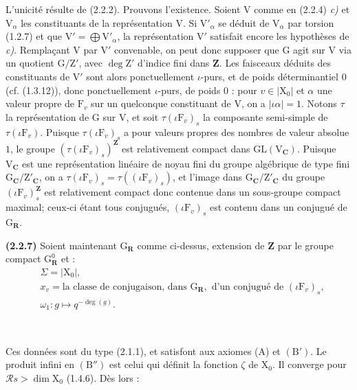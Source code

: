 \documentclass[11pt,leqno]{article}
\newcommand{\Page}[1]{\ifvmode\noindent\else\unskip\ \fi{\footnotesize\textcolor{gray}{[p.\,#1]}}\ \ignorespaces}
\begin{document}
L’unicité résulte de (2.2.2). Prouvons l’existence. Soient \(\mathrm V\) comme en (2.2.4) \textit{c)} et \(\mathrm V_\alpha\) les constituants de la représentation \(\mathrm V\). Si \(\mathrm V'_\alpha\) se déduit de \(\mathrm V_\alpha\) par torsion (1.2.7) et que \(\mathrm V'=\bigoplus\mathrm V'_\alpha\), la représentation \(\mathrm V'\) satisfait encore les hypothèses de \textit{c)}. Remplaçant \(\mathrm V\) par \(\mathrm V'\) convenable, on peut donc supposer que \(\mathrm G\) agit sur \(\mathrm V\) via un quotient \(\mathrm G/\mathrm Z'\), avec \(\deg\mathrm Z'\) d’indice fini dans \(\mathbf Z\). Les faisceaux déduits des constituants de \(\mathrm V'\) sont alors ponctuellement \(\iota\)-purs, et de poids déterminantiel \(0\) (cf. (1.3.12)), donc ponctuellement \(\iota\)-purs, de poids \(0\) : pour \(v\in|\mathrm X_0|\) et \(\alpha\) une valeur propre de \(\mathrm F_v\) sur un quelconque constituant de \(\mathrm V\), on a \(|\iota\alpha|=1\). Notons \(\tau\) la représentation de \(\mathrm G\) sur \(\mathrm V\), et soit \(\tau(\iota\mathrm F_v)_s\) la composante semi-simple de \(\tau(\iota\mathrm F_v)\). Puisque \(\tau(\iota\mathrm F_v)_s\) a pour valeurs propres des nombres de valeur absolue \(1\), le groupe \((\tau(\iota\mathrm F_v)_s)^{\mathbf Z}\) est relativement compact dans \(\mathrm{GL}(\mathrm V_{\mathbf C})\). Puisque \(\mathrm V_{\mathbf C}\) est une représentation linéaire de noyau fini du groupe algébrique de type fini \(\mathrm G_{\mathbf C}/\mathrm Z'_{\mathbf C}\), on a \(\tau(\iota\mathrm F_v)_s=\tau((\iota\mathrm F_v)_s)\), et l’image dans \(\mathrm G_{\mathbf C}/\mathrm Z'_{\mathbf C}\) du groupe \((\iota\mathrm F_v)_s^{\mathbf Z}\) est relativement compact donc contenue dans un sous-groupe compact maximal; ceux-ci étant tous conjugués, \((\iota\mathrm F_v)_s\) est contenu dans un conjugué de \(\mathrm G_{\mathbf R}\).

\textbf{(2.2.7)} Soient maintenant \(\mathrm G_{\mathbf R}\) comme ci-dessus, extension de \(\mathbf Z\) par le groupe compact \(\mathrm G_{\mathbf R}^0\) et :
\[
\begin{aligned}
&\Sigma=|\mathrm X_0|,\\
&x_v=\text{la classe de conjugaison, dans }\mathrm G_{\mathbf R},
  \text{ d’un conjugué de }(\iota\mathrm F_v)_s,\\
&\omega_1:g\mapsto q^{-\deg(g)}.
\end{aligned}
\]

\Page{195}

Ces données sont du type (2.1.1), et satisfont aux axiomes (A) et \((\mathrm B')\). Le produit infini en \((\mathrm B'')\) est celui qui définit la fonction \(\zeta\) de \(\mathrm X_0\). Il converge pour \(\mathscr R s>\dim\mathrm X_0\) (1.4.6). Dès lors :
\end{document}
